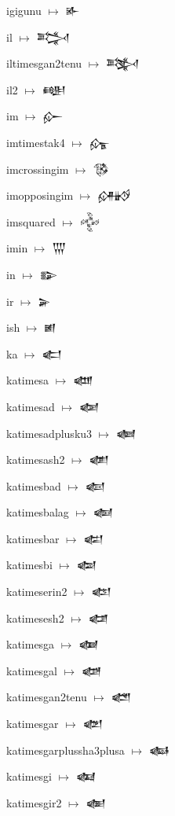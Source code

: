 {\noindent igigunu $\mapsto$ {\cufont 𒅊}\par
\noindent il $\mapsto$ {\cufont 𒅋}\par
\noindent iltimesgan2tenu $\mapsto$ {\cufont 𒅌}\par
\noindent il2 $\mapsto$ {\cufont 𒅍}\par
\noindent im $\mapsto$ {\cufont 𒅎}\par
\noindent imtimestak4 $\mapsto$ {\cufont 𒅏}\par
\noindent imcrossingim $\mapsto$ {\cufont 𒅐}\par
\noindent imopposingim $\mapsto$ {\cufont 𒅑}\par
\noindent imsquared $\mapsto$ {\cufont 𒅒}\par
\noindent imin $\mapsto$ {\cufont 𒅓}\par
\noindent in $\mapsto$ {\cufont 𒅔}\par
\noindent ir $\mapsto$ {\cufont 𒅕}\par
\noindent ish $\mapsto$ {\cufont 𒅖}\par
\noindent ka $\mapsto$ {\cufont 𒅗}\par
\noindent katimesa $\mapsto$ {\cufont 𒅘}\par
\noindent katimesad $\mapsto$ {\cufont 𒅙}\par
\noindent katimesadplusku3 $\mapsto$ {\cufont 𒅚}\par
\noindent katimesash2 $\mapsto$ {\cufont 𒅛}\par
\noindent katimesbad $\mapsto$ {\cufont 𒅜}\par
\noindent katimesbalag $\mapsto$ {\cufont 𒅝}\par
\noindent katimesbar $\mapsto$ {\cufont 𒅞}\par
\noindent katimesbi $\mapsto$ {\cufont 𒅟}\par
\noindent katimeserin2 $\mapsto$ {\cufont 𒅠}\par
\noindent katimesesh2 $\mapsto$ {\cufont 𒅡}\par
\noindent katimesga $\mapsto$ {\cufont 𒅢}\par
\noindent katimesgal $\mapsto$ {\cufont 𒅣}\par
\noindent katimesgan2tenu $\mapsto$ {\cufont 𒅤}\par
\noindent katimesgar $\mapsto$ {\cufont 𒅥}\par
\noindent katimesgarplussha3plusa $\mapsto$ {\cufont 𒅦}\par
\noindent katimesgi $\mapsto$ {\cufont 𒅧}\par
\noindent katimesgir2 $\mapsto$ {\cufont 𒅨}\par
}
